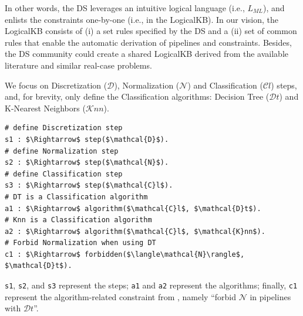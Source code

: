 In other words, the DS leverages an intuitive logical language (i.e., $L_{ML}$), and enlists the constraints one-by-one (i.e., in the LogicalKB).
In our vision, the LogicalKB consists of (i) a set rules specified by the DS and a (ii) set of common rules that enable the automatic derivation of pipelines and constraints.
Besides, the DS community could create a shared LogicalKB derived from the available literature and similar real-case problems.

\begin{example}\label{ex:kb}
We focus on Discretization ($\mathcal{D}$),  Normalization ($\mathcal{N}$) and Classification ($\mathcal{C}l$) steps, and, for brevity, only define the Classification algorithms: Decision Tree ($\mathcal{D}t$) and K-Nearest Neighbors ($\mathcal{K}nn$).
\begin{lstlisting}[mathescape=true]
# define Discretization step
s1 : $\Rightarrow$ step($\mathcal{D}$).
# define Normalization step
s2 : $\Rightarrow$ step($\mathcal{N}$).
# define Classification step
s3 : $\Rightarrow$ step($\mathcal{C}l$).
# DT is a Classification algorithm
a1 : $\Rightarrow$ algorithm($\mathcal{C}l$, $\mathcal{D}t$).
# Knn is a Classification algorithm
a2 : $\Rightarrow$ algorithm($\mathcal{C}l$, $\mathcal{K}nn$).
# Forbid Normalization when using DT
c1 : $\Rightarrow$ forbidden($\langle\mathcal{N}\rangle$, $\mathcal{D}t$).
\end{lstlisting}
\noindent \texttt{s1}, \texttt{s2}, and \texttt{s3} represent the steps; \texttt{a1} and \texttt{a2} represent the algorithms; finally, \texttt{c1} represent the algorithm-related constraint from , namely ``forbid $\mathcal{N}$ in pipelines with $\mathcal{D}t$''.
\end{example}

